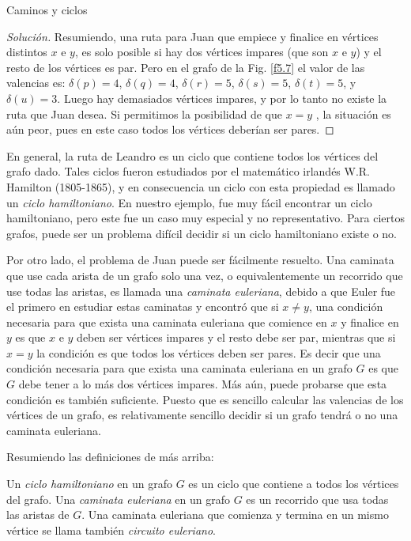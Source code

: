 \begin{section}{Caminos y ciclos}
\begin{ejemplo}
\begin{proof}[Solución]
    Resumiendo, una ruta para Juan que empiece y finalice en vértices distintos $x$ e $y$, es solo posible si hay dos vértices impares (que son $x$ e $y$) y el resto de los vértices es par.  Pero en el grafo de la Fig. \ref{f5.7} el valor de las valencias es: $\delta(p)=4$, $\delta(q)=4$, $\delta(r)=5$, $\delta(s)=5$, $\delta(t)=5$, y $\delta(u)=3$. Luego hay demasiados vértices impares, y por lo tanto no existe la ruta que Juan desea. Si permitimos la posibilidad de que $x=y$ , la situación es aún peor, pues en este caso todos los vértices deberían ser pares.
\end{proof}
\end{ejemplo}

En general, la ruta de Leandro es un ciclo que contiene todos los vértices del grafo dado. Tales ciclos fueron estudiados por el matemático irlandés W.R. Hamilton (1805-1865),   y en consecuencia un ciclo con esta propiedad es llamado un \textit{ciclo hamiltoniano}. En nuestro ejemplo, fue muy fácil  encontrar un ciclo hamiltoniano, pero este fue un caso muy especial y no representativo. Para ciertos grafos, puede ser un problema difícil decidir si un ciclo hamiltoniano existe o no.

Por otro lado, el problema de Juan puede ser fácilmente resuelto. Una caminata que use cada arista de un grafo solo una vez, o equivalentemente un recorrido que use todas las aristas, es llamada una \textit{caminata euleriana}, debido a que Euler  fue el primero en estudiar estas caminatas y encontró que si $x\not= y$, una condición necesaria para que exista una caminata euleriana que comience en $x$ y finalice en $y$ es que $x$ e $y$ deben ser vértices impares y el resto debe ser par, mientras que si $x=y$ la condición es que todos los vértices deben ser pares. Es decir que una condición necesaria para que exista una caminata euleriana en un grafo $G$
es que $G$ debe tener a lo más dos vértices impares. Más aún, puede probarse que esta condición es también suficiente. Puesto que es sencillo calcular las valencias de los vértices de un grafo, es relativamente sencillo decidir si un grafo tendrá o no una caminata euleriana. 

Resumiendo las definiciones de más arriba:

\begin{definicion}
Un \textit{ciclo hamiltoniano} en un grafo $G$ es un ciclo que contiene a todos los vértices del grafo. Una \textit{caminata euleriana} en un grafo $G$ es un recorrido que usa todas las aristas de $G$. Una caminata euleriana que comienza y termina en un mismo vértice se llama también \textit{circuito euleriano}.
\end{definicion}


\end{section}
